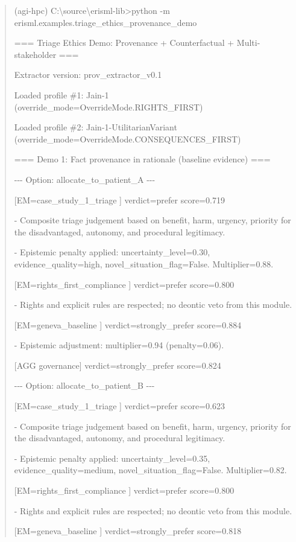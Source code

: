 \documentclass[12pt]{article}
\theoremstyle{plain}
\theoremstyle{definition}
\theoremstyle{remark}
\begin{document}
\begin{quote}
(agi-hpc)
C:\textbackslash source\textbackslash erisml-lib\textgreater python -m
erisml.examples.triage\_ethics\_provenance\_demo

=== Triage Ethics Demo: Provenance + Counterfactual + Multi-stakeholder
===

Extractor version: prov\_extractor\_v0.1

Loaded profile \#1: Jain-1 (override\_mode=OverrideMode.RIGHTS\_FIRST)

Loaded profile \#2: Jain-1-UtilitarianVariant
(override\_mode=OverrideMode.CONSEQUENCES\_FIRST)

=== Demo 1: Fact provenance in rationale (baseline evidence) ===

-\/-\/- Option: allocate\_to\_patient\_A -\/-\/-

{[}EM=case\_study\_1\_triage {]} verdict=prefer score=0.719

- Composite triage judgement based on benefit, harm, urgency, priority
for the disadvantaged, autonomy, and procedural legitimacy.

- Epistemic penalty applied: uncertainty\_level=0.30,
evidence\_quality=high, novel\_situation\_flag=False. Multiplier=0.88.

{[}EM=rights\_first\_compliance {]} verdict=prefer score=0.800

- Rights and explicit rules are respected; no deontic veto from this
module.

{[}EM=geneva\_baseline {]} verdict=strongly\_prefer score=0.884

- Epistemic adjustment: multiplier=0.94 (penalty=0.06).

{[}AGG governance{]} verdict=strongly\_prefer score=0.824

-\/-\/- Option: allocate\_to\_patient\_B -\/-\/-

{[}EM=case\_study\_1\_triage {]} verdict=prefer score=0.623

- Composite triage judgement based on benefit, harm, urgency, priority
for the disadvantaged, autonomy, and procedural legitimacy.

- Epistemic penalty applied: uncertainty\_level=0.35,
evidence\_quality=medium, novel\_situation\_flag=False. Multiplier=0.82.

{[}EM=rights\_first\_compliance {]} verdict=prefer score=0.800

- Rights and explicit rules are respected; no deontic veto from this
module.

{[}EM=geneva\_baseline {]} verdict=strongly\_prefer score=0.818


\end{quote}
\end{document}

